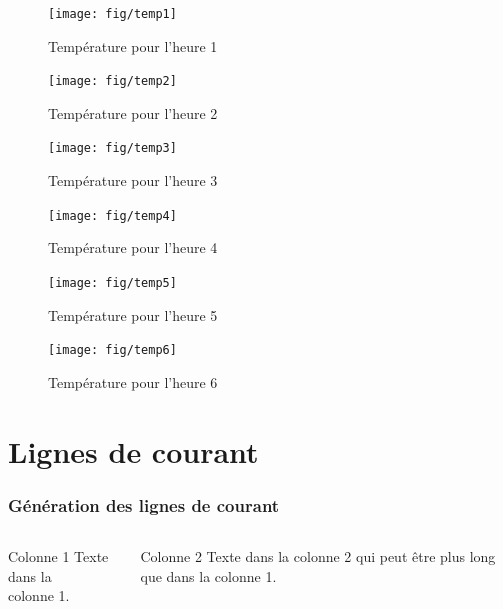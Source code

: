 \documentclass{beamer}
\begin{document}
\begin{frame} \frametitle{}

  \begin{overprint}

     \begin{figure}
      \centering
      \texttt{[image: fig/temp1]}
      \caption{Température pour l'heure 1}
    \end{figure}

     \begin{figure}
      \centering
      \texttt{[image: fig/temp2]}
      \caption{Température pour l'heure 2}
    \end{figure}

     \begin{figure}
      \centering
      \texttt{[image: fig/temp3]}
      \caption{Température pour l'heure 3}
    \end{figure}

     \begin{figure}
      \centering
      \texttt{[image: fig/temp4]}
      \caption{Température pour l'heure 4}
    \end{figure}

     \begin{figure}
      \centering
      \texttt{[image: fig/temp5]}
      \caption{Température pour l'heure 5}
    \end{figure}

     \begin{figure}
      \centering
      \texttt{[image: fig/temp6]}
      \caption{Température pour l'heure 6}
    \end{figure}

  \end{overprint}

\end{frame}


\section[Lignes de courant]{Lignes de courant}

\begin{frame}
  \frametitle{Génération des lignes de courant}
  \begin{columns}[T,totalwidth=\textwidth] %
  \begin{column}{5cm}
  \begin{block}{Colonne 1}
    Texte dans la\\
    colonne 1.
  \end{block}
  \end{column}

  \begin{column}{5cm}
  \begin{block}{Colonne 2}
    Texte dans la
    colonne 2 qui peut être
    plus long que dans la
    colonne 1.
  \end{block}
  \end{column}
 \end{columns}
\end{frame}
\end{document}
